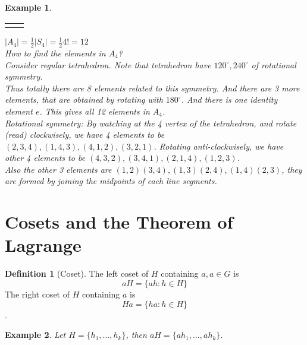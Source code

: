 \documentclass{article}
\theoremstyle{MyNonumberplain}
\theoremstyle{break}
\newcommand{\nline}{\begin{tabular}{ll}&\\\end{tabular}}
\theoremstyle{break}
\newtheorem{example}{Example}[section]
\theoremstyle{break}
\theoremstyle{definition}
\theoremstyle{break}
\newtheorem{definition}{Definition}[section]
\begin{document}
\begin{expbox}
    \begin{example}

        \nline

        $| A_4 | = \frac{1}{2} | S_4 | = \frac{1}{2} 4! = 12$\\

        How to find the elements in $A_4$?\\

        Consider regular tetrahedron. Note that tetrahedron have $120^{\circ}, 240^{\circ}$ of rotational symmetry.\\

        Thus totally there are 8 elements related to this symmetry. And there are 3 more elements, that are obtained by rotating with $180^{\circ}$. And there is one identity element $e$. This gives all 12 elements in $A_4$.\\
        
        Rotational symmetry: By watching at the 4 vertex of the tetrahedron, and
        rotate (read) clockwisely, we have 4 elements to be $(2, 3, 4), (1, 4, 3), (4,
        1, 2), (3, 2, 1)$. Rotating anti-clockwisely, we have other 4 elements to be
        $(4, 3, 2), (3, 4, 1), (2, 1, 4), (1, 2, 3)$.\\

Also the other 3 elements are $(1, 2) (3, 4), (1, 3) (2, 4), (1, 4) (2, 3)$,
they are formed by joining the midpoints of each line segments. 

    \end{example}
\end{expbox}

\newpage

\section{Cosets and the Theorem of Lagrange}

\begin{defbox}
    \begin{definition}[Coset]
        The left coset of $H$ containing $a, a \in G$ is $$a H = \{ a h : h \in H \}$$
        The right coset of $H$ containing $a$ is $$H a = \{ h a : h \in H \}$$.
    \end{definition}
\end{defbox}

\begin{expbox}
    \begin{example}
        Let $H = \{ h_1, \ldots, h_k \}$, then $a H = \{ a h_1, \ldots, a h_k \}$. 
    \end{example}
\end{expbox}
\end{document}
